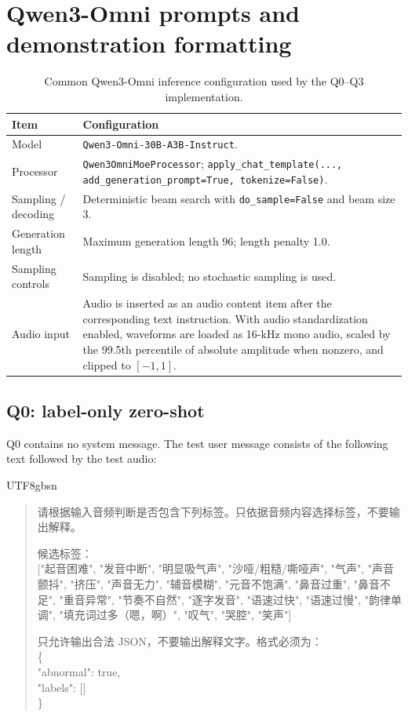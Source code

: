 \documentclass[10pt]{article}
\begin{document}
\section{Qwen3-Omni prompts and demonstration formatting}

\begin{table}[h]
\centering
\caption{Common Qwen3-Omni inference configuration used by the Q0--Q3 implementation.}
\label{tab:qwen_common_config}
\scriptsize
\begin{tabular}{p{}p{}}
\toprule
Item & Configuration \\
\midrule
Model & \texttt{Qwen3-Omni-30B-A3B-Instruct}. \\
Processor & \texttt{Qwen3OmniMoeProcessor}; \texttt{apply\_chat\_template(..., add\_generation\_prompt=True, tokenize=False)}. \\
Sampling / decoding & Deterministic beam search with \texttt{do\_sample=False} and beam size 3. \\
Generation length & Maximum generation length 96; length penalty 1.0. \\
Sampling controls & Sampling is disabled; no stochastic sampling is used. \\
Audio input & Audio is inserted as an audio content item after the corresponding text instruction. With audio standardization enabled, waveforms are loaded as 16-kHz mono audio, scaled by the 99.5th percentile of absolute amplitude when nonzero, and clipped to $[-1,1]$. \\
\bottomrule
\end{tabular}
\end{table}

\subsection{Q0: label-only zero-shot}
Q0 contains no system message. The test user message consists of the following text followed by the test audio:

\begin{CJK}{UTF8}{gbsn}
\begin{quote}\small
请根据输入音频判断是否包含下列标签。只依据音频内容选择标签，不要输出解释。

候选标签：\\{}
["起音困难", "发音中断", "明显吸气声", "沙哑/粗糙/嘶哑声", "气声", "声音颤抖", "挤压", "声音无力", "辅音模糊", "元音不饱满", "鼻音过重", "鼻音不足", "重音异常", "节奏不自然", "逐字发音", "语速过快", "语速过慢", "韵律单调", "填充词过多（嗯，啊）", "叹气", "哭腔", "笑声"]

只允许输出合法 JSON，不要输出解释文字。格式必须为：\\
\{\\
\quad "abnormal": true,\\
\quad "labels": []\\
\}
\end{quote}
\end{CJK}
\end{document}
